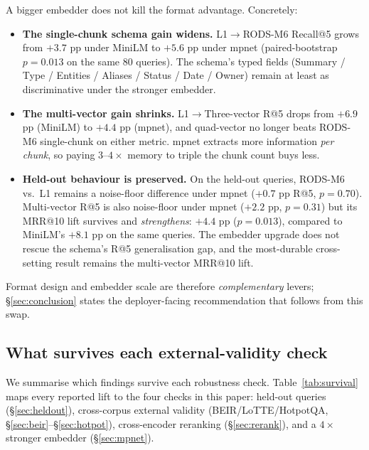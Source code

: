 \documentclass[11pt]{article}
\begin{document}
A bigger embedder does not kill the format advantage. Concretely:

\begin{itemize}[noitemsep,topsep=0.3em]
\item \textbf{The single-chunk schema gain widens.} L1$\to$RODS-M6
      Recall@5 grows from $+3.7$ pp under MiniLM to $+5.6$ pp under
      mpnet (paired-bootstrap $p{=}0.013$ on the same 80 queries).
      The schema's typed fields (Summary / Type / Entities / Aliases /
      Status / Date / Owner) remain at least as discriminative under
      the stronger embedder.
\item \textbf{The multi-vector gain shrinks.} L1$\to$Three-vector R@5
      drops from $+6.9$ pp (MiniLM) to $+4.4$ pp (mpnet), and quad-vector
      no longer beats RODS-M6 single-chunk on either metric. mpnet
      extracts more information \emph{per chunk}, so paying $3$--$4{\times}$
      memory to triple the chunk count buys less.
\item \textbf{Held-out behaviour is preserved.} On the held-out
      queries, RODS-M6 vs.\ L1 remains a noise-floor difference under
      mpnet ($+0.7$ pp R@5, $p{=}0.70$). Multi-vector R@5 is also
      noise-floor under mpnet ($+2.2$ pp, $p{=}0.31$) but its MRR@10
      lift survives and \emph{strengthens}: $+4.4$ pp ($p{=}0.013$),
      compared to MiniLM's $+8.1$ pp on the same queries. The embedder
      upgrade does not rescue the schema's R@5 generalisation gap, and
      the most-durable cross-setting result remains the multi-vector
      MRR@10 lift.
\end{itemize}

Format design and embedder scale are therefore \emph{complementary}
levers; \S\ref{sec:conclusion} states the deployer-facing
recommendation that follows from this swap.

\subsection{What survives each external-validity check}
\label{sec:survival}

We summarise which findings survive each robustness check.
Table~\ref{tab:survival} maps every reported lift to the four checks
in this paper: held-out queries (\S\ref{sec:heldout}), cross-corpus
external validity (BEIR/LoTTE/HotpotQA, \S\ref{sec:beir}--\S\ref{sec:hotpot}),
cross-encoder reranking (\S\ref{sec:rerank}), and a
$4{\times}$ stronger embedder (\S\ref{sec:mpnet}).
\end{document}
